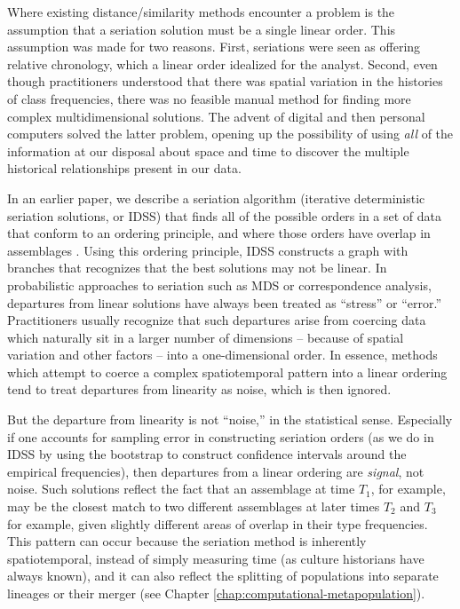 Where existing distance/similarity methods encounter a problem is the
assumption that a seriation solution must be a single linear order. This 
assumption was made for two reasons.  First, seriations were seen as offering relative 
chronology, which a linear order idealized for the analyst.  Second, even though
practitioners understood that there was spatial variation in the histories of class frequencies, 
there was no feasible manual method for finding more complex multidimensional solutions.  
The advent of digital and then personal computers solved the latter problem, opening
up the possibility of using \emph{all} of the information at our disposal about space and time
to discover the multiple historical relationships present in our data.

In
an earlier paper, we describe a seriation algorithm (iterative
deterministic seriation solutions, or IDSS) that finds all of the
possible orders in a set of data that conform to an ordering principle,
and where those orders have overlap in assemblages
\citep{Lipo2015}.  Using this ordering principle, IDSS
constructs a graph with branches that recognizes that the best solutions
may not be linear. In probabilistic approaches to seriation such as MDS
or correspondence analysis, departures from linear solutions have always
been treated as ``stress'' or ``error.'' Practitioners usually recognize
that such departures arise from coercing data which naturally sit in a
larger number of dimensions -- because of spatial variation and other
factors -- into a one-dimensional order. In essence, methods which
attempt to coerce a complex spatiotemporal pattern into a linear
ordering tend to treat departures from linearity as noise, which is then
ignored.

But the departure from linearity is not ``noise,'' in the statistical
sense. Especially if one accounts for sampling error in constructing
seriation orders (as we do in IDSS by using the bootstrap to construct
confidence intervals around the empirical frequencies), then departures
from a linear ordering are \emph{signal}, not noise. Such solutions
reflect the fact that an assemblage at time \(T_1\), for example, may be
the closest match to two different assemblages at later times \(T_2\)
and \(T_3\) for example, given slightly different areas of overlap in
their type frequencies. This pattern can occur because the seriation
method is inherently spatiotemporal, instead of simply measuring time
(as culture historians have always known), and it can also reflect the
splitting of populations into separate lineages or their merger (see Chapter \ref{chap:computational-metapopulation}).

